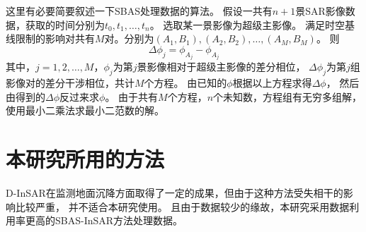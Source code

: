 这里有必要简要叙述一下SBAS处理数据的算法。
假设一共有$n+1$景SAR影像数据，获取的时间分别为$t_0,t_1,\ldots,t_n$。
选取某一景影像为超级主影像。
满足时空基线限制的影响对共有$M$对。分别为$(A_1,B_1),(A_2,B_2),\ldots,(A_M,B_M)$。
则
\begin{equation}
    \Delta\phi_j=\phi_{A_j}-\phi_{A_j}
\end{equation}
其中，$j=1,2,\ldots,M$，$\phi_j$为第$j$景影像相对于超级主影像的差分相位，
$\Delta\phi_j$为第$j$组影像对的差分干涉相位，共计$M$个方程。
由已知的$\phi$根据以上方程求得$\Delta\phi$，
然后由得到的$\Delta\phi$反过来求$\phi$。
由于共有$M$个方程，$n$个未知数，方程组有无穷多组解，使用最小二乘法求最小二范数的解。

\section{本研究所用的方法}
D-InSAR在监测地面沉降方面取得了一定的成果，但由于这种方法受失相干的影响比较严重，
并不适合本研究使用。
且由于数据较少的缘故，本研究采用数据利用率更高的SBAS-InSAR方法处理数据。

